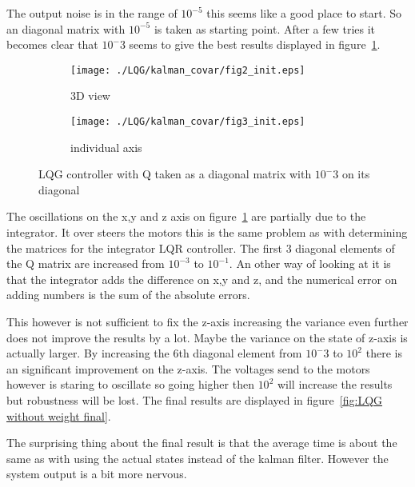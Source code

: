 The output noise is in the range of $10^{-5}$ this seems like a good place to start. So an diagonal matrix with $10^{-5}$ is taken as starting point. After a few tries it becomes clear that $10^-{3}$ seems to give the best results displayed in figure~\ref{fig:LQG step 1}.

\begin{figure}[H]
	\centering
	\begin{subfigure}[b]{0.3\textwidth}
		\texttt{[image: ./LQG/kalman\_covar/fig2\_init.eps]}
		\caption{3D view}
	\end{subfigure}
	\begin{subfigure}[b]{0.3\textwidth}
		\texttt{[image: ./LQG/kalman\_covar/fig3\_init.eps]}
		\caption{individual axis}
	\end{subfigure}
	\caption{LQG controller with Q taken as a diagonal matrix with $10^-3$ on its diagonal}\label{fig:LQG step 1}
\end{figure}

The oscillations on the x,y and z axis on figure~\ref{fig:LQG step 1} are partially due to the integrator. It over steers the motors this is the same problem as with determining the matrices for the integrator LQR controller. The first 3 diagonal elements of the Q matrix are increased from $10^{-3}$ to $10^{-1}$. An other way of looking at it is that the integrator adds the difference on x,y and z, and the numerical error on adding numbers is the sum of the absolute errors.

This however is not sufficient to fix the z-axis increasing the variance even further does not improve the results by a lot. Maybe the variance on the  state of z-axis is actually larger. By increasing the 6th diagonal element from $10^-3$ to $10^2$ there is an significant improvement on the z-axis. The voltages send to the motors however is staring to oscillate so going higher then $10^2$ will increase the results but robustness will be lost. The final results are displayed in figure~\ref{fig:LQG without weight final}.

The surprising thing about the final result is that the average time is about the same as with using the actual states instead of the kalman filter. However the system output is a bit more nervous. 

